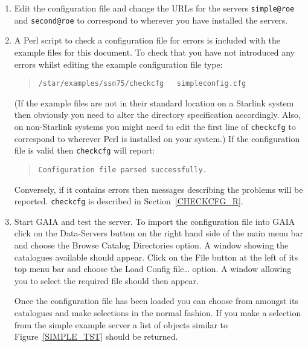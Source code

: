 \documentclass[twoside,11pt,nolof,chapters]{starlink}
\begin{document}
\begin{enumerate}

  \item Edit the configuration file and change the URLs for the servers
   \texttt{simple@roe} and \texttt{second@roe} to correspond to wherever
   you have installed the servers.

  \item A Perl script to check a configuration file for errors is
   included with the example files for this document.  To check that
   you have not introduced any errors whilst editing the example
   configuration file type:

  \begin{quote}
   \texttt{/star/examples/ssn75/checkcfg ~ simpleconfig.cfg}
  \end{quote}

   (If the example files are not in their standard location on a Starlink
   system then obviously you need to alter the directory specification
   accordingly.  Also, on non-Starlink systems you might need to edit the
   first line of \texttt{checkcfg} to correspond to wherever Perl is installed
   on your system.)  If the configuration file is valid then \texttt{checkcfg}
   will report:

  \begin{quote}
   \texttt{Configuration file parsed successfully.}
  \end{quote}

   Conversely, if it contains errors then messages describing the problems
   will be reported.  \texttt{checkcfg} is described in
   Section~\ref{CHECKCFG_R}.

  \item Start GAIA and test the server.  To import the configuration
   file into GAIA click on the \textsf{Data-Servers} button on the right
   hand side of the main menu bar and choose the \textsf{Browse Catalog
   Directories} option.  A window showing the catalogues available should
   appear.  Click on the \textsf{File} button at the left of its top menu
   bar and choose the \textsf{Load Config file\ldots} option.  A window
   allowing you to select the required file should then appear.

   Once the configuration file has been loaded you can choose from
   amongst its catalogues and make selections in the normal fashion.
   If you make a selection from the simple example server a list of
   objects similar to Figure~\ref{SIMPLE_TST} should be returned.

\end{enumerate}
\end{document}
